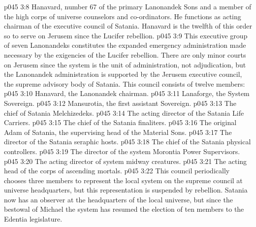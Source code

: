 \pc \vs p045 3:8 \bibnobreakspace {}Hanavard, number 67 of the primary Lanonandek Sons and a member of the high corps of universe counselors and co\hyp{}ordinators. He functions as acting chairman of the executive council of Satania. Hanavard is the twelfth of this order so to serve on Jerusem since the Lucifer rebellion.
\pc \vs p045 3:9 This executive group of seven Lanonandeks constitutes the expanded emergency administration made necessary by the exigencies of the Lucifer rebellion. There are only minor courts on Jerusem since the system is the unit of administration, not adjudication, but the Lanonandek administration is supported by the Jerusem executive council, the supreme advisory body of Satania. This council consists of twelve members:
\pc \vs p045 3:10 \bibnobreakspace Hanavard, the Lanonandek chairman.
\vs p045 3:11 \bibnobreakspace Lanaforge, the System Sovereign.
\vs p045 3:12 \bibnobreakspace Mansurotia, the first assistant Sovereign.
\vs p045 3:13 \bibnobreakspace The chief of Satania Melchizedeks.
\vs p045 3:14 \bibnobreakspace The acting director of the Satania Life Carriers.
\vs p045 3:15 \bibnobreakspace The chief of the Satania finaliters.
\vs p045 3:16 \bibnobreakspace The original Adam of Satania, the supervising head of the Material Sons.
\vs p045 3:17 \bibnobreakspace The director of the Satania seraphic hosts.
\vs p045 3:18 \bibnobreakspace The chief of the Satania physical controllers.
\vs p045 3:19 \bibnobreakspace The director of the system Morontia Power Supervisors.
\vs p045 3:20 \bibnobreakspace The acting director of system midway creatures.
\vs p045 3:21 \bibnobreakspace The acting head of the corps of ascending mortals.
\pc \vs p045 3:22 This council periodically chooses three members to represent the local system on the supreme council at universe headquarters, but this representation is suspended by rebellion. Satania now has an observer at the headquarters of the local universe, but since the bestowal of Michael the system has resumed the election of ten members to the Edentia legislature.
